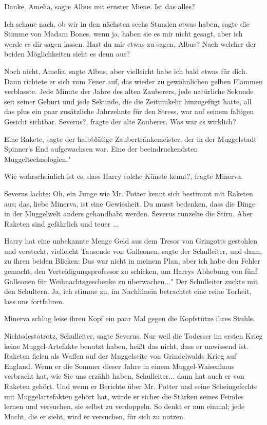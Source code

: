 \glqq{}Danke, Amelia\grqq{}, sagte Albus mit ernster Miene. \glqq{}Ist das
alles?\grqq{}

\glqq{}Ich schaue nach, ob wir in den nächsten sechs Stunden etwas haben\grqq{},
sagte die Stimme von Madam Bones, \glqq{}wenn ja, haben sie es mir nicht gesagt,
aber ich werde es dir sagen lassen. Hast du mir etwas zu sagen, Albus? Nach
welcher der beiden Möglichkeiten sieht es denn aus?\grqq{}

\glqq{}Noch nicht, Amelia\grqq{}, sagte Albus, \glqq{}aber vielleicht habe ich
bald etwas für dich.\grqq{} Dann richtete er sich vom Feuer auf, das wieder zu
gewöhnlichen gelben Flammen verblasste. Jede Minute der Jahre des alten
Zauberers, jede natürliche Sekunde seit seiner Geburt und jede Sekunde, die die
Zeitumkehr hinzugefügt hatte, all das plus ein paar zusätzliche Jahrzehnte für
den Stress, war auf seinem faltigen Gesicht sichtbar. \glqq{}Severus?\grqq{},
fragte der alte Zauberer. \glqq{}Was war es wirklich?\grqq{}

\glqq{}Eine Rakete\grqq{}, sagte der halbblütige Zaubertränkemeister, der in der
Muggelstadt Spinner's End aufgewachsen war. \glqq{}Eine der beeindruckendsten
Muggeltechnologien."

\glqq{}Wie wahrscheinlich ist es, dass Harry solche Künste kennt?\grqq{}, fragte
Minerva.

Severus lachte: \glqq{}Oh, ein Junge wie Mr. Potter kennt sich bestimmt mit
Raketen aus; das, liebe Minerva, ist eine Gewissheit. Du musst bedenken, dass
die Dinge in der Muggelwelt anders gehandhabt werden.\grqq{} Severus runzelte
die Stirn. \glqq{}Aber Raketen sind gefährlich und teuer ...\grqq{}

\glqq{}Harry hat eine unbekannte Menge Geld aus dem Tresor von Gringotts
gestohlen und versteckt, vielleicht Tausende von Galleonen\grqq{}, sagte der
Schulleiter, und dann, zu ihren beiden Blicken: \glqq{}Das war nicht in meinem
Plan, aber ich habe den Fehler gemacht, den Verteidigungsprofessor zu schicken,
um Harrys Abhebung von fünf Galleonen für Weihnachtsgeschenke zu überwachen..."
Der Schulleiter zuckte mit den Schultern. \glqq{}Ja, ich stimme zu, im Nachhinein
betrachtet eine reine Torheit, lass uns fortfahren.\grqq{}

Minerva schlug leise ihren Kopf ein paar Mal gegen die Kopfstütze ihres Stuhls.

\glqq{}Nichtsdestotrotz, Schulleiter\grqq{}, sagte Severus. \glqq{}Nur weil die
Todesser im ersten Krieg keine Muggel-Artefakte benutzt haben, heißt das nicht,
dass er unwissend ist. Raketen fielen als Waffen auf der Muggelseite von
Grindelwalds Krieg auf England. Wenn er die Sommer dieser Jahre in einem
Muggel-Waisenhaus verbracht hat, wie Sie uns erzählt haben, Schulleiter... dann
hat auch er von Raketen gehört. Und wenn er Berichte über Mr. Potter und seine
Scheingefechte mit Muggelartefakten gehört hat, würde er sicher die Stärken
seines Feindes lernen und versuchen, sie selbst zu verdoppeln. So denkt er nun
einmal; jede Macht, die er sieht, wird er versuchen, für sich zu nutzen.\grqq{}


